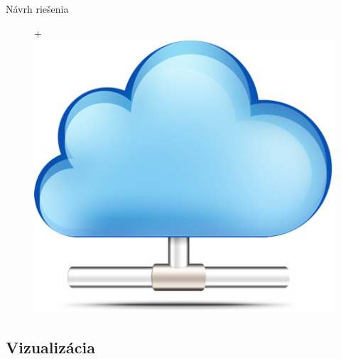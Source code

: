 \documentclass[hyperref={unicode}]{beamer}
\begin{document}
\begin{frame}{Návrh riešenia}
\begin{figure}[htp]
		{\Huge +}
		\includegraphics[align=c,height=\myGraphicsHeight]{cloud-computing}
	\end{figure}
\end{frame}



\subsection{Vizualizácia}
\label{sub:Vizualizácia}
\end{document}
